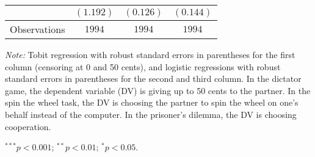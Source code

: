 \begin{table}[!t]
\begin{center}
{\begin{threeparttable}
\begin{tabular}{l c c c}
                             & $(1.192)$      & $(0.126)$     & $(0.144)$      \\
\midrule
Observations                 & $1994$         & $1994$        & $1994$         \\
\bottomrule
\end{tabular}
\begin{tablenotes}[flushleft]
\scriptsize{\item[\hspace{-5mm}] \textit{Note:} Tobit regression with robust standard errors in parentheses for the first column (censoring at 0 and 50 cents),
                                and logistic regressions with robust standard errors in parentheses for the second and third column.
                                In the dictator game, the dependent variable (DV) is giving up to 50 cents to the partner. 
                                In the spin the wheel task, the DV is choosing the partner to spin the wheel on one’s behalf instead of the computer. 
                                In the prisoner’s dilemma, the DV is choosing cooperation. \item[\hspace{-5mm}] $^{***}p<0.001$; $^{**}p<0.01$; $^{*}p<0.05$.}
\end{tablenotes}
\end{threeparttable}
}
\label{tab:behavior_logit_regression_emotional}
\end{center}
\end{table}

\renewcommand{\baselinestretch}{1.67}%
